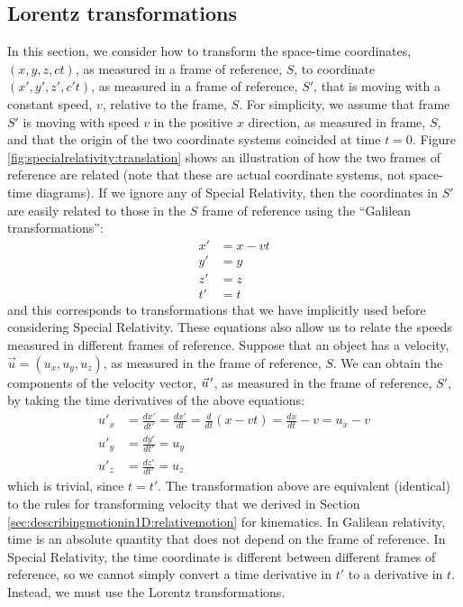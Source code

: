 \subsection{Lorentz transformations}
In this section, we consider how to transform the space-time coordinates, $(x,y,z,ct)$, as measured in a frame of reference, $S$, to coordinate $(x',y',z',c't)$, as measured in a frame of reference, $S'$, that is moving with a constant speed, $v$, relative to the frame, $S$. For simplicity, we assume that frame $S'$ is moving with speed $v$ in the positive $x$ direction, as measured in frame, $S$, and that the origin of the two coordinate systems coincided at time $t=0$. Figure \ref{fig:specialrelativity:translation} shows an illustration of how the two frames of reference are related (note that these are actual coordinate systems, not space-time diagrams).
If we ignore any of Special Relativity, then the coordinates in $S'$ are easily related to those in the $S$ frame of reference using the ``Galilean transformations'':
\begin{align*}
x' &= x - vt\\
y' &= y\\
z' &= z\\
t' &= t
\end{align*}
and this corresponds to transformations that we have implicitly used before considering Special Relativity. These equations also allow us to relate the speeds measured in different frames of reference. Suppose that an object has a velocity, $\vec u=(u_x,u_y,u_z)$, as measured in the frame of reference, $S$. We can obtain the components of the velocity vector, $\pvec u'$, as measured in the frame of reference, $S'$, by taking the time derivatives of the above equations:
\begin{align*}
u'_x &= \frac{dx'}{dt'}=\frac{dx'}{dt}=\frac{d}{dt}(x-vt)=\frac{dx}{dt}-v=u_x - v\\
u'_y &=\frac{dy'}{dt'}=u_y\\
u'_z &=\frac{dz'}{dt'}=u_z
\end{align*}
which is trivial, since $t=t'$. The transformation above are equivalent (identical) to the rules for transforming velocity that we derived in Section \ref{sec:describingmotionin1D:relativemotion} for kinematics. In Galilean relativity, time is an absolute quantity that does not depend on the frame of reference. In Special Relativity, the time coordinate is different between different frames of reference, so we cannot simply convert a time derivative in $t'$ to a derivative in $t$. Instead, we must use the Lorentz transformations.


